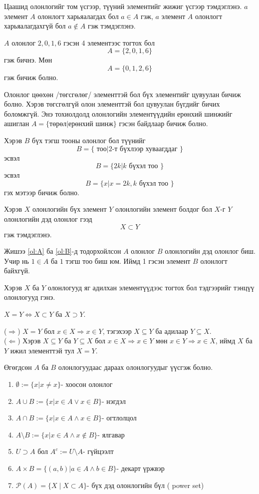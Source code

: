 Цаашид олонлогийг том үсгээр, түүний элементийг жижиг үсгээр тэмдэглэнэ. $a$ элемент $A$ олонлогт харьяалагдах бол $a\in A$ гэж, $a$ элемент $A$ олонлогт харьяалагдахгүй бол $a\notin A$ гэж тэмдэглэнэ. 
\begin{example}\label{ol:A} $A$ олонлог $2, 0, 1, 6$ гэсэн 4 элементээс тогтох бол $$A=\{2, 0, 1, 6\}$$ гэж бичнэ. Мөн $$A=\{0, 1, 2, 6\}$$ гэж бичиж болно.
\end{example}
Олонлог цөөхөн /төгсгөлөг/ элементтэй бол бүх элементийг цувуулан бичиж болно. Хэрэв төгсгөлгүй олон элементтэй бол цувуулан бүгдийг бичих боломжгүй. Энэ тохиолдолд олонлогийн элементүүдийн ерөнхий шинжийг ашиглан $A=\{{\text {төрөл}}| {\text{ерөнхий шинж}}\}$ гэсэн байдлаар бичиж болно. 
\begin{example}\label{ol:B}
Хэрэв $B$ бүх тэгш тооны олонлог бол түүнийг $$B=\{ {\text { тоо}}| {\text{2-т бүхлээр хуваагддаг }}\}$$ эсвэл $$B=\{2k| k{\text{ бүхэл тоо }}\}$$ эсвэл $$B=\{ x | x=2k, k{\text{ бүхэл тоо }}\}$$ гэх мэтээр бичиж болно. 
\end{example}
\begin{definition}
Хэрэв $X$ олонлогийн бүх элемент $Y$ олонлогийн элемент болдог бол $X$-г $Y$ олонлогийн дэд олонлог гээд $$X\subset Y$$ гэж тэмдэглэнэ. 
\end{definition}
Жишээ \ref{ol:A} ба \ref{ol:B}-д тодорхойлсон  $A$ олонлог  $B$ олонлогийн дэд олонлог биш. Учир нь $1\in A$ ба $1$ тэгш тоо биш юм. Иймд 1 гэсэн элемент $B$ олонлогт байхгүй.
\begin{definition}
Хэрэв $X$ ба $Y$ олонлогууд яг адилхан элементүүдээс тогтох бол тэдгээрийг тэнцүү олонлогууд гэнэ. 
\end{definition}
\begin{theorem}\label{Олонлог тэнцэх нөхцөл}
$X=Y\Leftrightarrow X\subset Y$ ба $X\supset Y.$ 
\end{theorem}
\begin{prof} 
($\Rightarrow$) $X=Y$ бол $x\in X\Rightarrow x\in Y$, тэгэхээр $X\subseteq Y$ ба адилаар  $Y\subseteq X$.\\
($\Leftarrow$) Хэрэв $X\subseteq Y$ ба $Y\subseteq X$ бол $x\in X\Rightarrow x\in Y$ мөн $x\in Y\Rightarrow x\in X$, иймд $X$ ба $Y$ ижил элементтэй тул $X=Y$.
\end{prof}
\begin{definition}
 Өгөгдсөн $A$ ба $B$ олонлогуудаас дараах олонлогуудыг үүсгэж болно.
\begin{enumerate}
\item $\emptyset:=\{x|x\neq x\}$- хоосон олонлог
\item $A\cup B:=\{x| x\in A \lor x\in B\}$- нэгдэл
\item $A\cap B:=\{x| x\in A \land x\in B\}$- огтлолцол
\item $A\setminus B:=\{x| x\in A \land x\notin B\}$- ялгавар 
\item $U\supset A$ бол $A^c:=U\setminus A$- гүйцээлт
\item $A\times B=\{(a,b)|a\in A \land b\in B\}$- декарт үржвэр
\item $\mathcal{P}(A)=\{X\mid X\subset A\}$- бүх дэд олонлогийн бүл ( power set)
\end{enumerate}
\end{definition}
